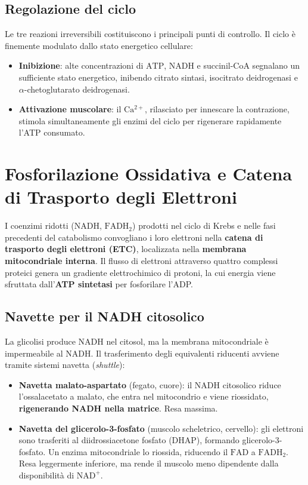 \documentclass[12pt,a4paper]{report}
\begin{document}
\subsection{Regolazione del ciclo}
Le tre reazioni irreversibili costituiscono i principali punti di controllo. Il ciclo è finemente modulato dallo stato energetico cellulare:
\begin{itemize}
\item \textbf{Inibizione}: alte concentrazioni di \(\mathrm{ATP}\), \(\mathrm{NADH}\) e succinil-CoA segnalano un sufficiente stato energetico, inibendo citrato sintasi, isocitrato deidrogenasi e \(\alpha\)-chetoglutarato deidrogenasi.
\item \textbf{Attivazione muscolare}: il \(\mathrm{Ca^{2+}}\), rilasciato per innescare la contrazione, stimola simultaneamente gli enzimi del ciclo per rigenerare rapidamente l'ATP consumato.
\end{itemize}

\section{Fosforilazione Ossidativa e Catena di Trasporto degli Elettroni}
I coenzimi ridotti (\(\mathrm{NADH}\), \(\mathrm{FADH_2}\)) prodotti nel ciclo di Krebs e nelle fasi precedenti del catabolismo convogliano i loro elettroni nella \textbf{catena di trasporto degli elettroni (ETC)}, localizzata nella \textbf{membrana mitocondriale interna}. Il flusso di elettroni attraverso quattro complessi proteici genera un gradiente elettrochimico di protoni, la cui energia viene sfruttata dall'\textbf{ATP sintetasi} per fosforilare l'ADP.
\subsection{Navette per il NADH citosolico}
La glicolisi produce \(\mathrm{NADH}\) nel citosol, ma la membrana mitocondriale è impermeabile al \(\mathrm{NADH}\). Il trasferimento degli equivalenti riducenti avviene tramite sistemi navetta (\textit{shuttle}):
\begin{itemize}
\item \textbf{Navetta malato-aspartato} (fegato, cuore): il \(\mathrm{NADH}\) citosolico riduce l'ossalacetato a malato, che entra nel mitocondrio e viene riossidato, \textbf{rigenerando NADH nella matrice}. Resa massima.
\item \textbf{Navetta del glicerolo-3-fosfato} (muscolo scheletrico, cervello): gli elettroni sono trasferiti al diidrossiacetone fosfato (DHAP), formando glicerolo-3-fosfato. Un enzima mitocondriale lo riossida, riducendo il \(\mathrm{FAD}\) a \(\mathrm{FADH_2}\). Resa leggermente inferiore, ma rende il muscolo meno dipendente dalla disponibilità di \(\mathrm{NAD^+}\).
\end{itemize}
\end{document}
